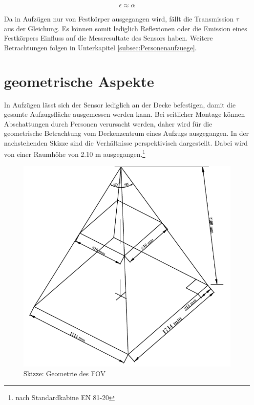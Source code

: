 \begin{equation}
\label{eq5}
\epsilon \approx  \alpha
\end{equation}

Da in Aufzügen nur von Festkörper ausgegangen wird, fällt die Transmission $\tau$ aus der Gleichung. Es können somit lediglich Reflexionen oder die Emission eines Festkörpers Einfluss auf die Messresultate des Sensors haben. Weitere Betrachtungen folgen in Unterkapitel \ref{subsec:Personenaufzuege}.

\section{geometrische Aspekte}
\label{sec:geometrie}

In Aufzügen lässt sich der Sensor lediglich an der Decke befestigen, damit die gesamte Aufzugsfläche ausgemessen werden kann. Bei seitlicher Montage können Abschattungen durch Personen verursacht werden, daher wird für die geometrische Betrachtung vom Deckenzentrum eines Aufzugs ausgegangen. In der nachstehenden Skizze sind die Verhältnisse perspektivisch dargestellt. Dabei wird von einer Raumhöhe von 2.10 m ausgegangen.\footnote[5]{nach Standardkabine EN 81-20}
 
 
\begin{figure}[H]
	\centering
	\includegraphics[width=1.0\textwidth]{fig/Skizze}
	\caption[Skizze Geometrie des \ac{FOV}]{Skizze: Geometrie des \ac{FOV}}
	\label{fig:skizze}
\end{figure}

